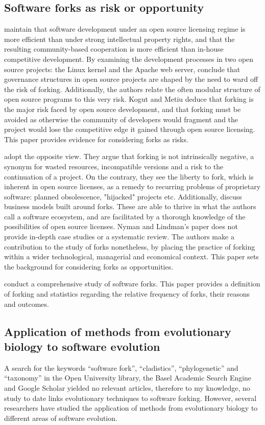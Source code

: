 \subsection{Software forks as risk or opportunity}
\citet{Kogut2001a} maintain that software development under an open source licensing regime is more efficient than under strong intellectual property rights, and that the resulting community-based cooperation is more efficient than in-house competitive development. By examining the development processes in two open source projects: the Linux kernel and the Apache web server, \citet{Kogut2001a} conclude that governance structures in open source projects are shaped by the need to ward off the risk of forking. Additionally, the authors relate the often modular structure of open source programs to this very risk. Kogut and Metiu deduce that forking is the major risk faced by open source development, and that forking must be avoided as otherwise the community of developers would fragment and the project would lose the competitive edge it gained through open source licensing. This paper provides evidence for considering forks as risks.

\citet{Nyman2013a} adopt the opposite view. They argue that forking is not intrinsically negative, a synonym for wasted resources, incompatible versions and a risk to the continuation of a project. On the contrary, they see the liberty to fork, which is inherent in open source licenses, as a remedy to recurring problems of proprietary software: planned obsolescence, "hijacked" projects etc. Additionally, \citet{Nyman2013a} discuss business models built around forks. These are able to thrive in what the authors call a software ecosystem, and are facilitated by a thorough knowledge of the possibilities of open source licenses. Nyman and Lindman's paper does not provide in-depth case studies or a systematic review. The authors make a contribution to the study of forks nonetheless, by placing the practice of forking within a wider technological, managerial and economical context. This paper sets the background for considering forks as opportunities.

\citet{Robles2012a} conduct a comprehensive study of software forks. This paper provides a definition of forking and statistics regarding the relative frequency of forks, their reasons and outcomes.

\subsection{Application of methods from evolutionary biology to software evolution}
A search for the keywords “software fork”, “cladistics”, “phylogenetic” and “taxonomy” in the Open University library, the Basel Academic Search Engine and Google Scholar yielded no relevant articles, therefore to my knowledge, no study to date links evolutionary techniques to software forking. However, several researchers have studied the application of methods from evolutionary biology to different areas of software evolution.

